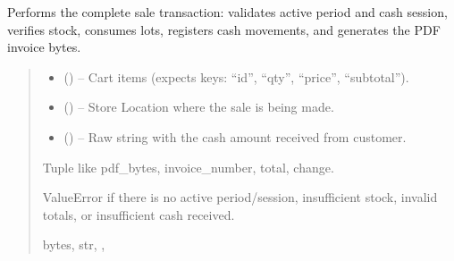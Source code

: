 \documentclass[a4paper,11pt,spanish]{sphinxmanual}
\begin{document}
\begin{fulllineitems}
\label{\detokenize{api/sale/sale.services:sale.services.make_sale_transaction}}
\pysigstartsignatures
\pysiglinewithargsret
{}
{\sphinxparamcomma {}\sphinxparamcomma {}}
{}
\pysigstopsignatures
\sphinxAtStartPar
Performs the complete sale transaction:
validates active period and cash session, verifies stock, consumes lots,
registers cash movements, and generates the PDF invoice bytes.
\begin{quote}\begin{description}
\begin{itemize}
\item {} 
\sphinxAtStartPar
{} (\sphinxstyleliteralemphasis{\sphinxupquote{{[}}}\sphinxstyleliteralemphasis{\sphinxupquote{{]}}}) – Cart items (expects keys: “id”, “qty”, “price”, “subtotal”).

\item {} 
\sphinxAtStartPar
{} ({\hyperref[\detokenize{api/inventory/inventory.models:inventory.models.Location}]{}}) – Store Location where the sale is being made.

\item {} 
\sphinxAtStartPar
{} () – Raw string with the cash amount received from customer.

\end{itemize}

\sphinxAtStartPar
Tuple like pdf\_bytes, invoice\_number, total, change.

\sphinxAtStartPar
ValueError if there is no active period/session, insufficient stock,
invalid totals, or insufficient cash received.

\sphinxAtStartPar
\sphinxstyleemphasis{Tuple}{[}bytes, str, , \sphinxstyleemphasis{Decimal}{]}

\end{description}\end{quote}

\end{fulllineitems}
\end{document}
